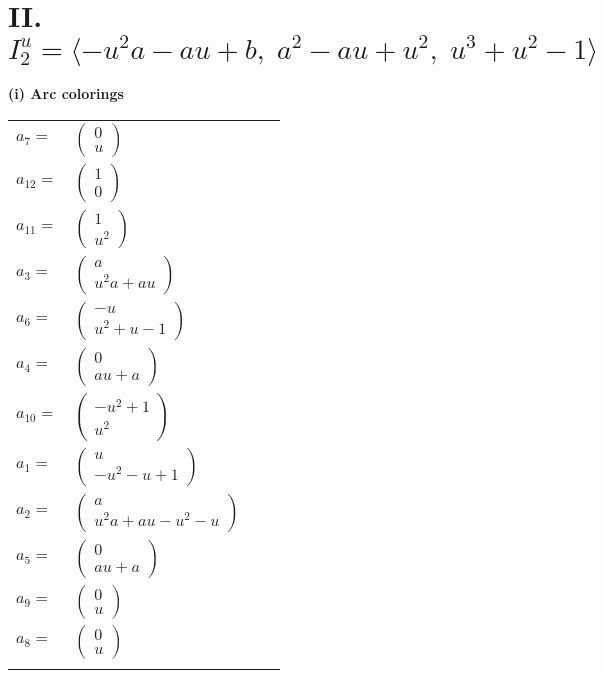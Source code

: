 \documentclass[1p]{elsarticle_modified}
\theoremstyle{definition}
\begin{document}
\centering \section*{II. $I^u_{2}= \langle - u^2 a- a u+b,\;a^2- a u+u^2,\;u^3+u^2-1 \rangle$}
\flushleft \textbf{(i) Arc colorings}\\
\begin{tabular}{m{7pt} m{180pt} m{7pt} m{180pt} }
\flushright $a_{7}=$&$\begin{pmatrix}0\\u\end{pmatrix}$ \\
\flushright $a_{12}=$&$\begin{pmatrix}1\\0\end{pmatrix}$ \\
\flushright $a_{11}=$&$\begin{pmatrix}1\\u^2\end{pmatrix}$ \\
\flushright $a_{3}=$&$\begin{pmatrix}a\\u^2 a+a u\end{pmatrix}$ \\
\flushright $a_{6}=$&$\begin{pmatrix}- u\\u^2+u-1\end{pmatrix}$ \\
\flushright $a_{4}=$&$\begin{pmatrix}0\\a u+a\end{pmatrix}$ \\
\flushright $a_{10}=$&$\begin{pmatrix}- u^2+1\\u^2\end{pmatrix}$ \\
\flushright $a_{1}=$&$\begin{pmatrix}u\\- u^2- u+1\end{pmatrix}$ \\
\flushright $a_{2}=$&$\begin{pmatrix}a\\u^2 a+a u- u^2- u\end{pmatrix}$ \\
\flushright $a_{5}=$&$\begin{pmatrix}0\\a u+a\end{pmatrix}$ \\
\flushright $a_{9}=$&$\begin{pmatrix}0\\u\end{pmatrix}$ \\
\flushright $a_{8}=$&$\begin{pmatrix}0\\u\end{pmatrix}$\\&\end{tabular}
\end{document}
